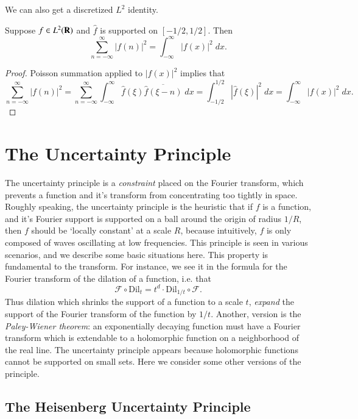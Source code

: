 We can also get a discretized $L^2$ identity.

\begin{theorem}
    Suppose $f \in L^2(\operatorname{\mathbf{R}})$ and $\widehat{f}$ is supported on $[-1/2,1/2]$. Then
    \[ \sum_{n = -\infty}^\infty |f(n)|^2 = \int_{-\infty}^\infty |f(x)|^2\; dx. \]
\end{theorem}
\begin{proof}
    Poisson summation applied to $|f(x)|^2$ implies that
    \[ \sum_{n = -\infty}^\infty |f(n)|^2 = \sum_{n = -\infty}^\infty \int_{-\infty}^\infty \widehat{f}(\xi) \overline{\widehat{f}(\xi - n)}\; dx = \int_{-1/2}^{1/2} |\widehat{f}(\xi)|^2\; dx = \int_{-\infty}^\infty |f(x)|^2\; dx. \]
\end{proof}






\section{The Uncertainty Principle}

The uncertainty principle is a \emph{constraint} placed on the Fourier transform, which prevents a function and it's transform from concentrating too tightly in space. Roughly speaking, the uncertainty principle is the heuristic that if $f$ is a function, and it's Fourier support is supported on a ball around the origin of radius $1/R$, then $f$ should be `locally constant' at a scale $R$, because intuitively, $f$ is only composed of waves oscillating at low frequencies. This principle is seen in various scenarios, and we describe some basic situations here. This property is fundamental to the transform. For instance, we see it in the formula for the Fourier transform of the dilation of a function, i.e. that
%
\[ \mathcal{F} \circ \text{Dil}_t = t^d \cdot \text{Dil}_{1/t} \circ \mathcal{F}. \]
%
Thus dilation which shrinks the support of a function to a scale $t$, \emph{expand} the support of the Fourier transform of the function by $1/t$. Another, version is the \emph{Paley-Wiener theorem}: an exponentially decaying function must have a Fourier transform which is extendable to a holomorphic function on a neighborhood of the real line. The uncertainty principle appears because holomorphic functions cannot be supported on small sets. Here we consider some other versions of the principle.

\subsection{The Heisenberg Uncertainty Principle}

